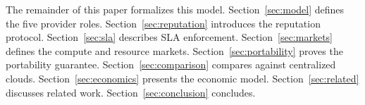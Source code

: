 The remainder of this paper formalizes this model. Section~\ref{sec:model}
defines the five provider roles. Section~\ref{sec:reputation} introduces
the reputation protocol. Section~\ref{sec:sla} describes SLA enforcement.
Section~\ref{sec:markets} defines the compute and resource markets.
Section~\ref{sec:portability} proves the portability guarantee.
Section~\ref{sec:comparison} compares against centralized clouds.
Section~\ref{sec:economics} presents the economic model.
Section~\ref{sec:related} discusses related work.
Section~\ref{sec:conclusion} concludes.

